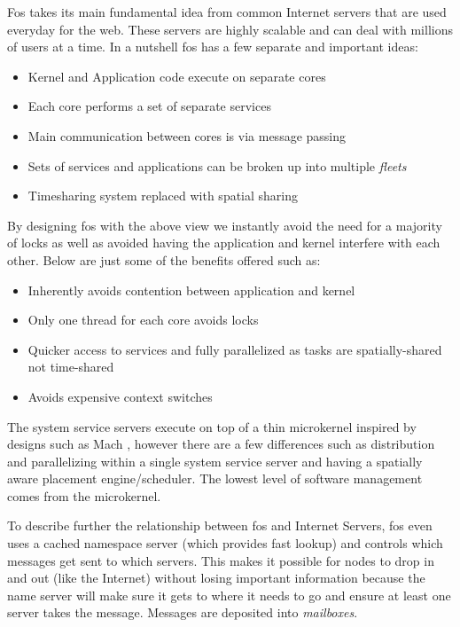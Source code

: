 \documentclass[journal]{IEEEtran}
\begin{document}
Fos takes its main fundamental idea from common Internet servers that are used everyday for the web. These servers are highly scalable and can deal with millions of users at a time. In a nutshell fos has a few separate and important ideas:

\vspace{2 mm}

\begin{itemize}
\item Kernel and Application code execute on separate cores
\item Each core performs a set of separate services
\item Main communication between cores is via message passing
\item Sets of services and applications can be broken up into multiple \emph{fleets}
\item Timesharing system replaced with spatial sharing
\end{itemize}

\vspace{5 mm}

By designing fos with the above view we instantly avoid the need for a majority of locks as well as avoided having the application and kernel interfere with each other. Below are just some of the benefits offered such as:

\vspace{2 mm}

\begin{itemize}
\item Inherently avoids contention between application and kernel
\item Only one thread for each core avoids locks
\item Quicker access to services and fully parallelized as tasks are spatially-shared not time-shared
\item Avoids expensive context switches
\end{itemize}

\vspace{5 mm}

The system service servers execute on top of a thin microkernel inspired by designs such as Mach \cite{Mach}, however there are a few differences such as distribution and parallelizing within a single system service server and having a spatially aware placement engine/scheduler. The lowest level of software management comes from the microkernel.

To describe further the relationship between fos and Internet Servers, fos even uses a cached namespace server (which provides fast lookup) and controls which messages get sent to which servers. This makes it possible for nodes to drop in and out (like the Internet) without losing important information because the name server will make sure it gets to where it needs to go and ensure at least one server takes the message. Messages are deposited into \emph{mailboxes}.
\end{document}
